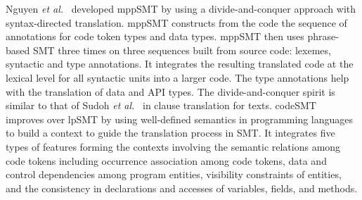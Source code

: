 Nguyen {\em et al.}~\cite{ase15} developed mppSMT by using a
divide-and-conquer approach with syntax-directed translation. mppSMT
constructs from the code the sequence of annotations for code token
types and data types. mppSMT then uses phrase-based SMT three times on
three sequences built from source code: lexemes, syntactic and type
annotations. It integrates the resulting translated code at the
lexical level for all syntactic units into a larger code. The type
annotations help with the translation of data and API types.
The divide-and-conquer spirit is similar to that of Sudoh {\em et
  al.}~\cite{sudoh15} in clause translation for texts.
%
codeSMT~\cite{icsme16} improves over lpSMT by using well-defined
semantics in programming languages to build a context to guide the
translation process in SMT. It integrates five types of features
forming the contexts involving the semantic relations among code
tokens including occurrence association among code tokens, data and
control dependencies among program entities, visibility constraints of
entities, and the consistency in declarations and accesses of
variables, fields, and methods.







